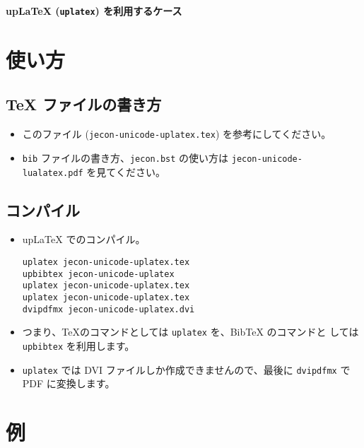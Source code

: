 \documentclass[uplatex,dvipdfmx]{jsarticle}
\begin{document}
\begin{flushleft}
 {\Large \textbf{upLaTeX (\texttt{uplatex}) を利用するケース}}
\end{flushleft}

\vspace{1em}

\section{使い方}

\subsection{TeX ファイルの書き方}

\begin{itemize}
 \item このファイル (\texttt{jecon-unicode-uplatex.tex}) を参考にしてください。
 \item \texttt{bib} ファイルの書き方、\texttt{jecon.bst} の使い方は
       \texttt{jecon-unicode-lualatex.pdf} を見てください。
\end{itemize}

\subsection{コンパイル}

\begin{itemize}
 \item upLaTeX でのコンパイル。
\begin{verbatim}
uplatex jecon-unicode-uplatex.tex
upbibtex jecon-unicode-uplatex
uplatex jecon-unicode-uplatex.tex               
uplatex jecon-unicode-uplatex.tex
dvipdfmx jecon-unicode-uplatex.dvi
\end{verbatim}
 \item つまり、\TeX のコマンドとしては \texttt{uplatex} を、BibTeX のコマンドと
       しては \texttt{upbibtex} を利用します。
 \item \texttt{uplatex} では DVI ファイルしか作成できませんので、最後に
       \texttt{dvipdfmx} で PDF に変換します。
\end{itemize}

\section{例}



\nocite{*}



%

\end{document}
